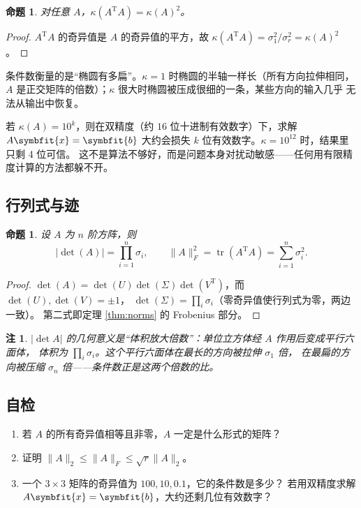 \documentclass[UTF8, 11pt, a4paper, fontset=windows]{ctexart}
\theoremstyle{cnthm}
\newtheorem{prop}[thm]{命题}
\theoremstyle{cndef}
\newtheorem{rem}[defn]{注}
\newcommand{\T}{^{\mathrm{T}}}
\newcommand{\nrm}[1]{\lVert #1 \rVert}
\newcommand{\abs}[1]{\lvert #1 \rvert}
\DeclareMathOperator{\tr}{tr}
\newcommand{\x}{\symbfit{x}}
\newcommand{\bb}{\symbfit{b}}
\begin{document}
\begin{prop}\label{prop:cond-square}
对任意 $A$，$\kappa(A\T A)=\kappa(A)^2$。
\end{prop}

\begin{proof}
$A\T A$ 的奇异值是 $A$ 的奇异值的平方，故
$\kappa(A\T A)=\sigma_1^2/\sigma_r^2=\kappa(A)^2$。
\end{proof}

条件数衡量的是“椭圆有多扁”。$\kappa=1$ 时椭圆的半轴一样长（所有方向拉伸相同，
$A$ 是正交矩阵的倍数）；$\kappa$ 很大时椭圆被压成很细的一条，某些方向的输入几乎
无法从输出中恢复。

\begin{keybox}[条件数的实际含义]
若 $\kappa(A)=10^{k}$，则在双精度（约 $16$ 位十进制有效数字）下，求解 $A\x=\bb$
大约会损失 $k$ 位有效数字。$\kappa=10^{12}$ 时，结果里只剩 4 位可信。
这不是算法不够好，而是问题本身对扰动敏感——任何用有限精度计算的方法都躲不开。
\end{keybox}

\subsection{行列式与迹}

\begin{prop}\label{prop:det}
设 $A$ 为 $n$ 阶方阵，则
\begin{equation}
  \abs{\det(A)}=\prod_{i=1}^{n}\sigma_i,\qquad
  \nrm{A}_F^2=\tr(A\T A)=\sum_{i=1}^{n}\sigma_i^2 .
\end{equation}
\end{prop}

\begin{proof}
$\det(A)=\det(U)\det(\Sigma)\det(V\T)$，而 $\det(U),\det(V)=\pm1$，
$\det(\Sigma)=\prod_i\sigma_i$（零奇异值使行列式为零，两边一致）。
第二式即定理 \ref{thm:norms} 的 Frobenius 部分。
\end{proof}

\begin{rem}
$\abs{\det A}$ 的几何意义是“体积放大倍数”：单位立方体经 $A$ 作用后变成平行六面体，
体积为 $\prod_i\sigma_i$。这个平行六面体在最长的方向被拉伸 $\sigma_1$ 倍，
在最扁的方向被压缩 $\sigma_n$ 倍——条件数正是这两个倍数的比。
\end{rem}

\subsection*{自检}
\begin{enumerate}
  \item 若 $A$ 的所有奇异值相等且非零，$A$ 一定是什么形式的矩阵？
  \item 证明 $\nrm{A}_2\le\nrm{A}_F\le\sqrt{r}\nrm{A}_2$。
  \item 一个 $3\times3$ 矩阵的奇异值为 $100,10,0.1$，它的条件数是多少？
        若用双精度求解 $A\x=\bb$，大约还剩几位有效数字？
\end{enumerate}
\end{document}
